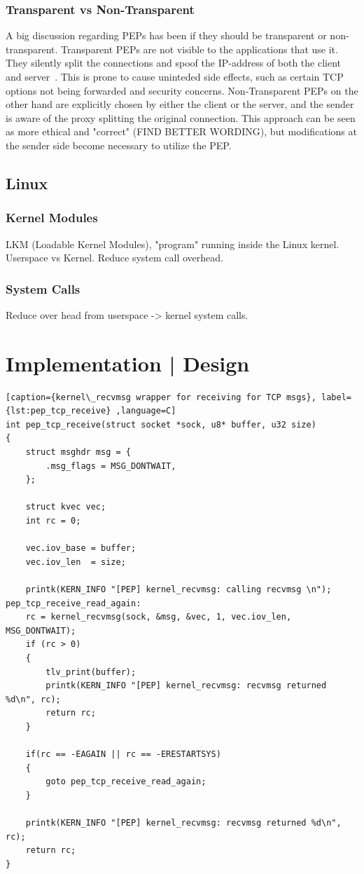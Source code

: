 \documentclass[a4paper,english, 11pt]{report}
\begin{document}
\subsection{Transparent vs Non-Transparent}
A big discussion regarding PEPs has been if they should be transparent or non-transparent. Transparent PEPs are not visible to the applications that use it. They silently split the connections and spoof the IP-address of both the client and server~\cite{pep_dna}. This is prone to cause uninteded side effects, such as certain TCP options not being forwarded and security concerns. Non-Transparent PEPs on the other hand are explicitly chosen by either the client or the server, and the sender is aware of the proxy splitting the original connection. This approach can be seen as more ethical and "correct" (FIND BETTER WORDING), but modifications at the sender side become necessary to utilize the PEP.

\section{Linux}

\subsection{Kernel Modules}
LKM (Loadable Kernel Modules), "program" running inside the Linux kernel.
Userspace vs Kernel. Reduce system call overhead.
\subsection{System Calls}
Reduce over head from userspace -> kernel system calls.

\chapter{Implementation | Design}

\begin{lstlisting}[caption={kernel\_recvmsg wrapper for receiving for TCP msgs}, label={lst:pep_tcp_receive} ,language=C]
int pep_tcp_receive(struct socket *sock, u8* buffer, u32 size)
{
	struct msghdr msg = {
		.msg_flags = MSG_DONTWAIT,
	};

	struct kvec vec;
	int rc = 0;

	vec.iov_base = buffer;
	vec.iov_len  = size;

	printk(KERN_INFO "[PEP] kernel_recvmsg: calling recvmsg \n");
pep_tcp_receive_read_again:
	rc = kernel_recvmsg(sock, &msg, &vec, 1, vec.iov_len, MSG_DONTWAIT);
	if (rc > 0)
	{
		tlv_print(buffer);
		printk(KERN_INFO "[PEP] kernel_recvmsg: recvmsg returned %d\n", rc);
		return rc;
	}

	if(rc == -EAGAIN || rc == -ERESTARTSYS)
	{
		goto pep_tcp_receive_read_again;
	}

	printk(KERN_INFO "[PEP] kernel_recvmsg: recvmsg returned %d\n", rc);
	return rc;
}
\end{lstlisting}
\end{document}
